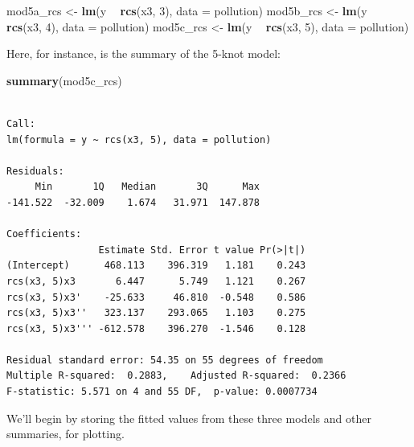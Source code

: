 \documentclass[]{book}
\newenvironment{Shaded}{\begin{snugshade}}{\end{snugshade}}
\newcommand{\KeywordTok}[1]{\textcolor[rgb]{0.13,0.29,0.53}{\textbf{#1}}}
\newcommand{\DataTypeTok}[1]{\textcolor[rgb]{0.13,0.29,0.53}{#1}}
\newcommand{\DecValTok}[1]{\textcolor[rgb]{0.00,0.00,0.81}{#1}}
\newcommand{\StringTok}[1]{\textcolor[rgb]{0.31,0.60,0.02}{#1}}
\newcommand{\OperatorTok}[1]{\textcolor[rgb]{0.81,0.36,0.00}{\textbf{#1}}}
\newcommand{\NormalTok}[1]{#1}
\theoremstyle{definition}
\theoremstyle{definition}
\theoremstyle{definition}
\theoremstyle{remark}
\begin{document}
\begin{Shaded}
\begin{Highlighting}[]
\NormalTok{mod5a_rcs <-}\StringTok{ }\KeywordTok{lm}\NormalTok{(y }\OperatorTok{~}\StringTok{ }\KeywordTok{rcs}\NormalTok{(x3, }\DecValTok{3}\NormalTok{), }\DataTypeTok{data =}\NormalTok{ pollution)}
\NormalTok{mod5b_rcs <-}\StringTok{ }\KeywordTok{lm}\NormalTok{(y }\OperatorTok{~}\StringTok{ }\KeywordTok{rcs}\NormalTok{(x3, }\DecValTok{4}\NormalTok{), }\DataTypeTok{data =}\NormalTok{ pollution)}
\NormalTok{mod5c_rcs <-}\StringTok{ }\KeywordTok{lm}\NormalTok{(y }\OperatorTok{~}\StringTok{ }\KeywordTok{rcs}\NormalTok{(x3, }\DecValTok{5}\NormalTok{), }\DataTypeTok{data =}\NormalTok{ pollution)}
\end{Highlighting}
\end{Shaded}

Here, for instance, is the summary of the 5-knot model:

\begin{Shaded}
\begin{Highlighting}[]
\KeywordTok{summary}\NormalTok{(mod5c_rcs)}
\end{Highlighting}
\end{Shaded}

\begin{verbatim}

Call:
lm(formula = y ~ rcs(x3, 5), data = pollution)

Residuals:
     Min       1Q   Median       3Q      Max 
-141.522  -32.009    1.674   31.971  147.878 

Coefficients:
                Estimate Std. Error t value Pr(>|t|)
(Intercept)      468.113    396.319   1.181    0.243
rcs(x3, 5)x3       6.447      5.749   1.121    0.267
rcs(x3, 5)x3'    -25.633     46.810  -0.548    0.586
rcs(x3, 5)x3''   323.137    293.065   1.103    0.275
rcs(x3, 5)x3''' -612.578    396.270  -1.546    0.128

Residual standard error: 54.35 on 55 degrees of freedom
Multiple R-squared:  0.2883,    Adjusted R-squared:  0.2366 
F-statistic: 5.571 on 4 and 55 DF,  p-value: 0.0007734
\end{verbatim}

We'll begin by storing the fitted values from these three models and
other summaries, for plotting.

\begin{Shaded}
\end{Shaded}
\end{document}
